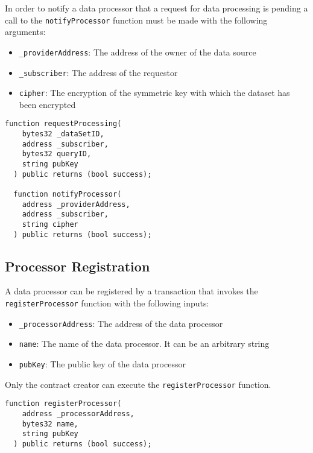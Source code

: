 In order to notify a data processor that a request for data processing is pending a call to the \verb|notifyProcessor| function must be made with the following arguments:

\begin{itemize}
  \item \verb|_providerAddress|: The address of the owner of the data source
  \item \verb|_subscriber|: The address of the requestor
  \item \verb|cipher|: The encryption of the symmetric key with which the dataset has been encrypted
\end{itemize}

\begin{lstlisting}[language=Solidity, caption={Request for processing functions}]
  function requestProcessing(
    bytes32 _dataSetID,
    address _subscriber,
    bytes32 queryID,
    string pubKey
  ) public returns (bool success);

  function notifyProcessor(
    address _providerAddress,
    address _subscriber,
    string cipher
  ) public returns (bool success);

\end{lstlisting}

\subsection{Processor Registration}
\label{implemenation:contracts:reg_processor}

A data processor can be registered by a transaction that invokes the  \verb|registerProcessor| function with the following inputs:

\begin{itemize}
  \item \verb|_processorAddress|: The address of the data processor
  \item \verb|name|: The name of the data processor. It can be an arbitrary string
  \item \verb|pubKey|: The public key of the data processor
\end{itemize}

Only the contract creator can execute the \verb|registerProcessor| function.

\begin{lstlisting}[language=Solidity, caption={Data processor registration function}]
  function registerProcessor(
    address _processorAddress,
    bytes32 name,
    string pubKey
  ) public returns (bool success);
\end{lstlisting}

